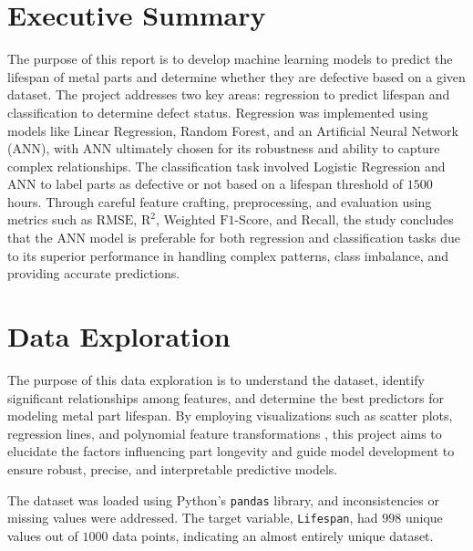 \documentclass{article}
\begin{document}
\begin{cwauthorlist}
\end{cwauthorlist}

\section{Executive Summary}

The purpose of this report is to develop machine learning models to predict the lifespan of metal parts and determine whether they are defective based on a given dataset. The project addresses two key areas: regression to predict lifespan and classification to determine defect status. Regression was implemented using models like Linear Regression, Random Forest, and an Artificial Neural Network (ANN), with ANN ultimately chosen for its robustness and ability to capture complex relationships. The classification task involved Logistic Regression and ANN to label parts as defective or not based on a lifespan threshold of $1500$ hours. Through careful feature crafting, preprocessing, and evaluation using metrics such as $\text{RMSE}$, $\text{R}^2$, Weighted $\text{F1}$-Score, and Recall, the study concludes that the ANN model is preferable for both regression and classification tasks due to its superior performance in handling complex patterns, class imbalance, and providing accurate predictions.

\section{Data Exploration}

The purpose of this data exploration is to understand the dataset, identify significant relationships among features, and determine the best predictors for modeling metal part lifespan. By employing visualizations such as scatter plots, regression lines, and polynomial feature transformations \parencite{paulson2022feature}, this project aims to elucidate the factors influencing part longevity and guide model development to ensure robust, precise, and interpretable predictive models.

The dataset was loaded using Python's \texttt{pandas} library, and inconsistencies or missing values were addressed. The target variable, \texttt{Lifespan}, had $998$ unique values out of $1000$ data points, indicating an almost entirely unique dataset.
\end{document}

